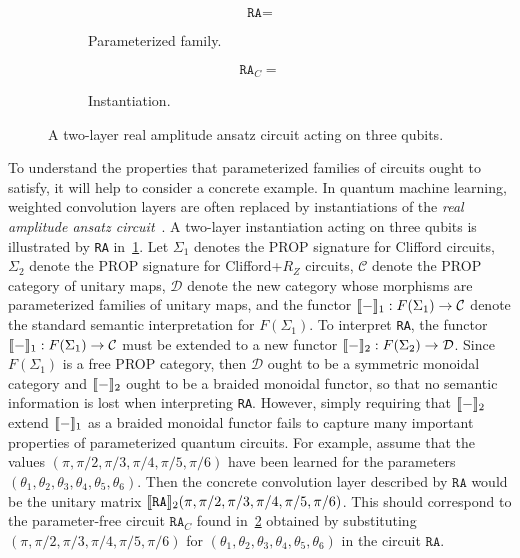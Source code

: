 \newcommand{\RealAmp}{\texttt{RA}\xspace}
\begin{figure}[t]
    \begin{subfigure}[b]{0.48\textwidth}
        \centering
        \begin{equation*}
            \RealAmp = 
        \end{equation*}
        \caption{Parameterized family.}
        \label{Fig:Circuits:Family}
    \end{subfigure}
    \begin{subfigure}[b]{0.48\textwidth}
        \centering
        \begin{equation*}
            \RealAmp_C = 
        \end{equation*}
        \caption{Instantiation.}
        \label{Fig:Circuits:Instance}
    \end{subfigure}
    \caption{A two-layer real amplitude ansatz circuit acting on three qubits.}
    \label{Fig:Circuits}
\end{figure}

To understand the properties that parameterized families of circuits ought to satisfy, it will help to consider a concrete example.
In quantum machine learning, weighted convolution layers are often replaced by instantiations of the \emph{real amplitude ansatz circuit}~\cite{AbbasSutter2021,ArthurDate2022,DekelFrankel2023,KannoNakamura2024,YoffeEntin2024}.
A two-layer instantiation acting on three qubits is illustrated by \RealAmp in~\cref{Fig:Circuits:Family}.
Let $\Sigma_1$ denotes the PROP signature for Clifford circuits, $\Sigma_2$ denote the PROP signature for Clifford+$R_Z$ circuits, $\mathcal{C}$ denote the PROP category of unitary maps, $\mathcal{D}$ denote the new category whose morphisms are parameterized families of unitary maps, and the functor $\llbracket-\rrbracket_1: F( \Sigma_1 ) \to \mathcal{C}$ denote the standard semantic interpretation for $F( \Sigma_1 )$.
To interpret \RealAmp, the functor $\llbracket-\rrbracket_1: F( \Sigma_1 ) \to \mathcal{C}$ must be extended to a new functor $\llbracket-\rrbracket_2: F( \Sigma_2 ) \to \mathcal{D}$.
Since $F( \Sigma_1 )$ is a free PROP category, then $\mathcal{D}$ ought to be a symmetric monoidal category and $\llbracket-\rrbracket_2$ ought to be a braided monoidal functor, so that no semantic information is lost when interpreting \RealAmp.
However, simply requiring that $\llbracket-\rrbracket_2$ extend $\llbracket-\rrbracket_1$ as a braided monoidal functor fails to capture many important properties of parameterized quantum circuits.
For example, assume that the values $( \pi, \pi/2, \pi/3, \pi/4, \pi/5, \pi/6 )$ have been learned for the parameters $( \theta_1, \theta_2, \theta_3, \theta_4, \theta_5, \theta_6 )$.
Then the concrete convolution layer described by $\RealAmp$ would be the unitary matrix $\sem{\RealAmp}_2( \pi, \pi/2, \pi/3, \pi/4, \pi/5, \pi/6 )$.
This should correspond to the parameter-free circuit $\RealAmp_C$ found in~\cref{Fig:Circuits:Instance} obtained by substituting $( \pi, \pi/2, \pi/3, \pi/4, \pi/5, \pi/6 )$ for $( \theta_1, \theta_2, \theta_3, \theta_4, \theta_5, \theta_6 )$ in the circuit $\RealAmp$.

